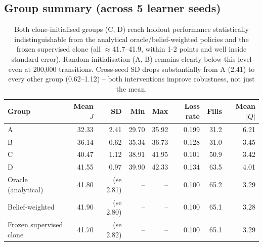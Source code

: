 \subsection*{Group summary (across 5 learner seeds)}
\begin{table}[h]
\centering
\begin{tabular}{lrrrrrrr}
\hline
Group & Mean $J$ & SD & Min & Max & Loss rate & Fills & Mean $|Q|$ \\
\hline
A & 32.33 & 2.41 & 29.70 & 35.92 & 0.199 & 31.2 & 6.21 \\
B & 36.14 & 0.62 & 35.34 & 36.73 & 0.128 & 31.0 & 3.45 \\
C & 40.47 & 1.12 & 38.91 & 41.95 & 0.101 & 50.9 & 3.42 \\
D & 41.55 & 0.97 & 39.90 & 42.33 & 0.134 & 63.5 & 4.01 \\
\hline
Oracle (analytical)  & 41.80 & (se 2.81) & -- & -- & 0.100 & 65.2 & 3.29 \\
Belief-weighted      & 41.90 & (se 2.80) & -- & -- & 0.100 & 65.1 & 3.28 \\
Frozen supervised clone & 41.70 & (se 2.82) & -- & -- & 0.100 & 65.1 & 3.29 \\
\hline
\end{tabular}
\caption{Both clone-initialised groups (C, D) reach holdout performance statistically
indistinguishable from the analytical oracle/belief-weighted policies and the frozen supervised
clone (all $\approx$41.7--41.9, within 1-2 points and well inside standard error). Random
initialisation (A, B) remains clearly below this level even at 200{,}000 transitions. Cross-seed
SD drops substantially from A (2.41) to every other group (0.62--1.12) -- both interventions
improve robustness, not just the mean.}
\end{table}

